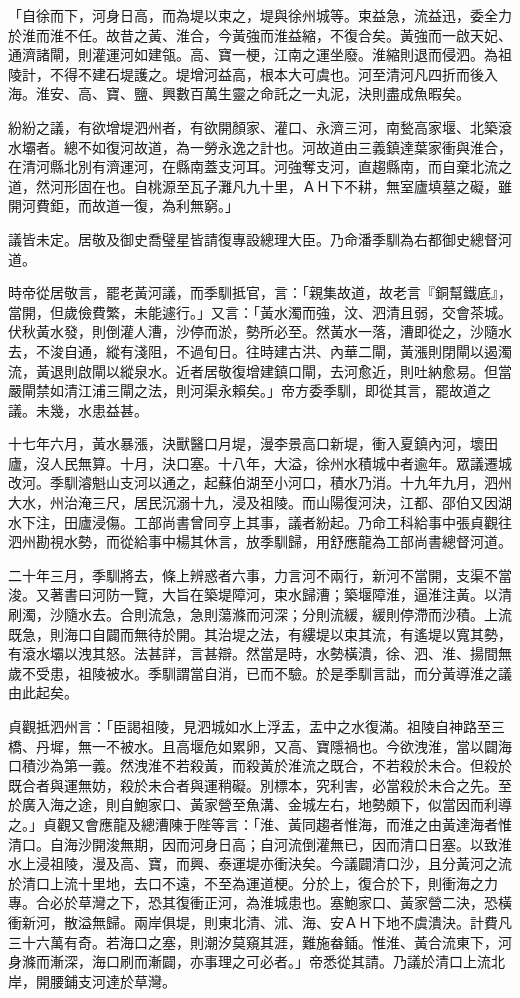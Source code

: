 「自徐而下，河身日高，而為堤以束之，堤與徐州城等。束益急，流益迅，委全力於淮而淮不任。故昔之黃、淮合，今黃強而淮益縮，不復合矣。黃強而一啟天妃、通濟諸閘，則灌運河如建瓴。高、寶一梗，江南之運坐廢。淮縮則退而侵泗。為祖陵計，不得不建石堤護之。堤增河益高，根本大可虞也。河至清河凡四折而後入海。淮安、高、寶、鹽、興數百萬生靈之命託之一丸泥，決則盡成魚暇矣。

紛紛之議，有欲增堤泗州者，有欲開顏家、灌口、永濟三河，南甃高家堰、北築滾水壩者。總不如復河故道，為一勞永逸之計也。河故道由三義鎮達葉家衝與淮合，在清河縣北別有濟運河，在縣南蓋支河耳。河強奪支河，直趨縣南，而自棄北流之道，然河形固在也。自桃源至瓦子灘凡九十里，ＡＨ下不耕，無室廬填墓之礙，雖開河費鉅，而故道一復，為利無窮。」

議皆未定。居敬及御史喬璧星皆請復專設總理大臣。乃命潘季馴為右都御史總督河道。

時帝從居敬言，罷老黃河議，而季馴抵官，言：「親集故道，故老言『銅幫鐵底』，當開，但歲儉費繁，未能遽行。」又言：「黃水濁而強，汶、泗清且弱，交會茶城。伏秋黃水發，則倒灌人漕，沙停而淤，勢所必至。然黃水一落，漕即從之，沙隨水去，不浚自通，縱有淺阻，不過旬日。往時建古洪、內華二閘，黃漲則閉閘以遏濁流，黃退則啟閘以縱泉水。近者居敬復增建鎮口閘，去河愈近，則吐納愈易。但當嚴閘禁如清江浦三閘之法，則河渠永賴矣。」帝方委季馴，即從其言，罷故道之議。未幾，水患益甚。

十七年六月，黃水暴漲，決獸醫口月堤，漫李景高口新堤，衝入夏鎮內河，壞田廬，沒人民無算。十月，決口塞。十八年，大溢，徐州水積城中者逾年。眾議遷城改河。季馴濬魁山支河以通之，起蘇伯湖至小河口，積水乃消。十九年九月，泗州大水，州治淹三尺，居民沉溺十九，浸及祖陵。而山陽復河決，江都、邵伯又因湖水下注，田廬浸傷。工部尚書曾同亨上其事，議者紛起。乃命工科給事中張貞觀往泗州勘視水勢，而從給事中楊其休言，放季馴歸，用舒應龍為工部尚書總督河道。

二十年三月，季馴將去，條上辨惑者六事，力言河不兩行，新河不當開，支渠不當浚。又著書曰河防一覽，大旨在築堤障河，束水歸漕；築堰障淮，逼淮注黃。以清刷濁，沙隨水去。合則流急，急則蕩滌而河深；分則流緩，緩則停滯而沙積。上流既急，則海口自闢而無待於開。其治堤之法，有縷堤以束其流，有遙堤以寬其勢，有滾水壩以洩其怒。法甚詳，言甚辯。然當是時，水勢橫潰，徐、泗、淮、揚間無歲不受患，祖陵被水。季馴謂當自消，已而不驗。於是季馴言詘，而分黃導淮之議由此起矣。

貞觀抵泗州言：「臣謁祖陵，見泗城如水上浮盂，盂中之水復滿。祖陵自神路至三橋、丹墀，無一不被水。且高堰危如累卵，又高、寶隱禍也。今欲洩淮，當以闢海口積沙為第一義。然洩淮不若殺黃，而殺黃於淮流之既合，不若殺於未合。但殺於既合者與運無妨，殺於未合者與運稍礙。別標本，究利害，必當殺於未合之先。至於廣入海之途，則自鮑家口、黃家營至魚溝、金城左右，地勢頗下，似當因而利導之。」貞觀又會應龍及總漕陳于陛等言：「淮、黃同趨者惟海，而淮之由黃達海者惟清口。自海沙開浚無期，因而河身日高；自河流倒灌無已，因而清口日塞。以致淮水上浸祖陵，漫及高、寶，而興、泰運堤亦衝決矣。今議闢清口沙，且分黃河之流於清口上流十里地，去口不遠，不至為運道梗。分於上，復合於下，則衝海之力專。合必於草灣之下，恐其復衝正河，為淮城患也。塞鮑家口、黃家營二決，恐橫衝新河，散溢無歸。兩岸俱堤，則東北清、沭、海、安ＡＨ下地不虞潰決。計費凡三十六萬有奇。若海口之塞，則潮汐莫窺其涯，難施畚鍤。惟淮、黃合流東下，河身滌而漸深，海口刷而漸闢，亦事理之可必者。」帝悉從其請。乃議於清口上流北岸，開腰鋪支河達於草灣。

